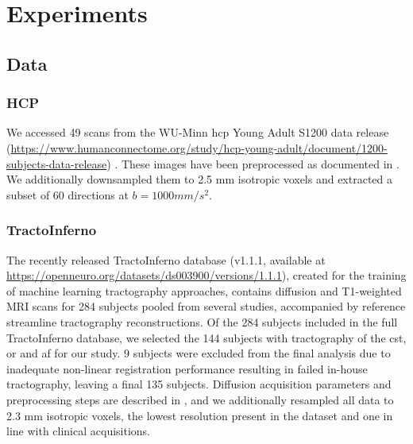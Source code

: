 \chapter{Experiments}
\label{}


\section{Data}
\label{sec:data}



\subsection{HCP}

We accessed 49 scans from the WU-Minn \gls{hcp} Young Adult S1200 data release (\url{https://www.humanconnectome.org/study/hcp-young-adult/document/1200-subjects-data-release}) \autocite{VanEssen2013}.
These images have been preprocessed as documented in \textcite{Glasser2013}.
We additionally downsampled them to 2.5 mm isotropic voxels and extracted a subset of 60 directions at $b=1000 mm/s^2$.

\subsection{TractoInferno}

The recently released TractoInferno database (v1.1.1, available at \url{https://openneuro.org/datasets/ds003900/versions/1.1.1}),\autocite{Poulin2022} created for the training of machine learning tractography approaches, contains diffusion and T1-weighted MRI scans for 284 subjects pooled from several studies, accompanied by reference streamline tractography reconstructions.
Of the 284 subjects included in the full TractoInferno database, we selected the 144 subjects with tractography of the \gls{cst}, \gls{or} and \gls{af} for our study.
9 subjects were excluded from the final analysis due to inadequate non-linear registration performance resulting in failed in-house tractography, leaving a final 135 subjects.
Diffusion acquisition parameters and preprocessing steps are described in \textcite{Poulin2022}, and we additionally resampled all data to 2.3 mm isotropic voxels, the lowest resolution present in the dataset and one in line with clinical acquisitions.

